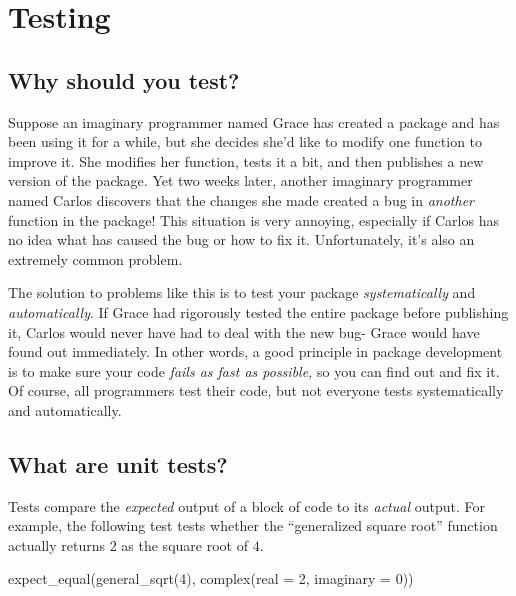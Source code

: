 \documentclass[
]{book}
\newenvironment{Shaded}{\begin{snugshade}}{\end{snugshade}}
\newcommand{\AttributeTok}[1]{\textcolor[rgb]{0.77,0.63,0.00}{#1}}
\newcommand{\DecValTok}[1]{\textcolor[rgb]{0.00,0.00,0.81}{#1}}
\newcommand{\FunctionTok}[1]{\textcolor[rgb]{0.00,0.00,0.00}{#1}}
\newcommand{\NormalTok}[1]{#1}
\begin{document}
\hypertarget{testing}{%
\section{Testing}\label{testing}}

\hypertarget{why-should-you-test}{%
\subsection{Why should you test?}\label{why-should-you-test}}

Suppose an imaginary programmer named Grace has created a package and has been using it for a while, but she decides she'd like to modify one function to improve it. She modifies her function, tests it a bit, and then publishes a new version of the package. Yet two weeks later, another imaginary programmer named Carlos discovers that the changes she made created a bug in \emph{another} function in the package! This situation is very annoying, especially if Carlos has no idea what has caused the bug or how to fix it. Unfortunately, it's also an extremely common problem.

The solution to problems like this is to test your package \emph{systematically} and \emph{automatically}. If Grace had rigorously tested the entire package before publishing it, Carlos would never have had to deal with the new bug- Grace would have found out immediately. In other words, a good principle in package development is to make sure your code \emph{fails as fast as possible,} so you can find out and fix it. Of course, all programmers test their code, but not everyone tests systematically and automatically.

\hypertarget{what-are-unit-tests}{%
\subsection{What are unit tests?}\label{what-are-unit-tests}}

Tests compare the \emph{expected} output of a block of code to its \emph{actual} output. For example, the following test tests whether the ``generalized square root'' function actually returns \(2\) as the square root of \(4\).

\begin{Shaded}
\begin{Highlighting}[]
\FunctionTok{expect\_equal}\NormalTok{(}\FunctionTok{general\_sqrt}\NormalTok{(}\DecValTok{4}\NormalTok{), }\FunctionTok{complex}\NormalTok{(}\AttributeTok{real =} \DecValTok{2}\NormalTok{, }\AttributeTok{imaginary =} \DecValTok{0}\NormalTok{))}
\end{Highlighting}
\end{Shaded}
\end{document}
